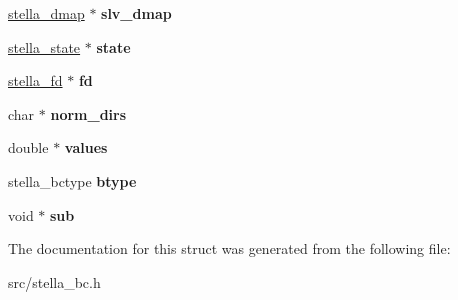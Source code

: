 \begin{DoxyCompactItemize}
\mbox{\label{structstella__bc___a453c6b9c2481ed13c7af4a0d335d8d85}} 
\mbox{\hyperlink{structstella__dmap}{stella\+\_\+dmap}} $\ast$ {\bfseries slv\+\_\+dmap}
\item 
\mbox{\label{structstella__bc___a7953ce53a948c0f3efc9434428841bf4}} 
\mbox{\hyperlink{structstella__state}{stella\+\_\+state}} $\ast$ {\bfseries state}
\item 
\mbox{\label{structstella__bc___a5278ffab5eefeb6a31f20b8a9d5c5459}} 
\mbox{\hyperlink{structstella__fd}{stella\+\_\+fd}} $\ast$ {\bfseries fd}
\item 
\mbox{\label{structstella__bc___aba8525bca86e3dd60c88a29b7ccedf07}} 
char $\ast$ {\bfseries norm\+\_\+dirs}
\item 
\mbox{\label{structstella__bc___a8a1a4185efac5ecc628e0c476fdda717}} 
double $\ast$ {\bfseries values}
\item 
\mbox{\label{structstella__bc___abddb095336957605b8d2a5babaaaaf64}} 
stella\+\_\+bctype {\bfseries btype}
\item 
\mbox{\label{structstella__bc___a8b1e44390d286055ef05ab8ec3dd48da}} 
void $\ast$ {\bfseries sub}
\end{DoxyCompactItemize}


The documentation for this struct was generated from the following file\+:\begin{DoxyCompactItemize}
\item 
src/stella\+\_\+bc.\+h\end{DoxyCompactItemize}
